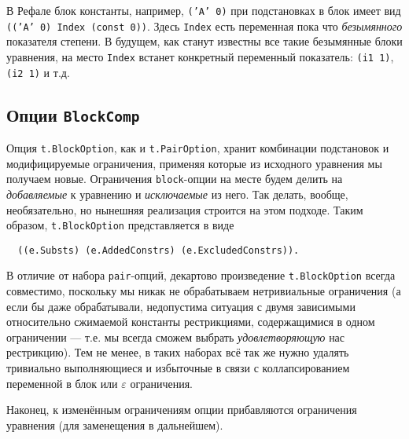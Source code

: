 \documentclass[12pt]{article}
\begin{document}
В Рефале блок константы, например, \texttt{('A' 0)} при подстановках в блок
имеет вид \texttt{(('A' 0) Index (const 0))}. Здесь \texttt{Index} есть
переменная пока что \textit{безымянного} показателя степени. В будущем, как
станут известны все такие безымянные блоки уравнения, на место \texttt{Index}
встанет конкретный переменный показатель: \texttt{(i1 1)}, \texttt{(i2 1)} и
т.д.


\subsection{Опции \texttt{BlockComp}} \label{block-option}

Опция \texttt{t.BlockOption}, как и \texttt{t.PairOption}, хранит комбинации
подстановок и модифицируемые ограничения, применяя которые из исходного
уравнения мы получаем новые. Ограничения \texttt{block}-опции на месте будем
делить на \textit{добавляемые} к уравнению и \textit{исключаемые} из него. Так
делать, вообще, необязательно, но нынешняя реализация строится на этом подходе.
Таким образом, \texttt{t.BlockOption} представляется в виде
\begin{Verbatim}
  ((e.Substs) (e.AddedConstrs) (e.ExcludedConstrs)). 
\end{Verbatim}


В отличие от набора \texttt{pair}-опций, декартово произведение
\texttt{t.BlockOption} всегда совместимо, поскольку мы никак не обрабатываем
нетривиальные ограничения (а если бы даже обрабатывали, недопустима ситуация
с двумя зависимыми относительно сжимаемой константы рестрикциями, содержащимися
в одном ограничении --- т.е. мы всегда сможем выбрать \textit{удовлетворяющую}
нас рестрикцию). Тем не менее, в таких наборах всё так же нужно удалять
тривиально выполняющиеся и избыточные в связи с коллапсированием переменной в
блок или $\varepsilon$ ограничения.

Наконец, к изменённым ограничениям опции прибавляются ограничения уравнения
(для заменещения в дальнейшем).
\end{document}
